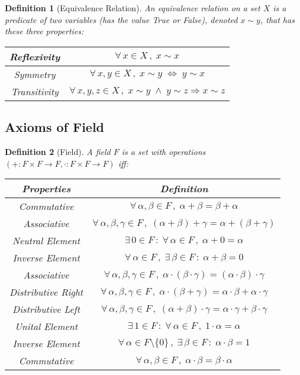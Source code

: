 \documentclass[12pt]{article}
\let\RA\Rightarrow
\let\LR\Leftrightarrow
\newcommand{\Forall}[1]{\forall\,{#1}\,,\;}
\newcommand{\Exist}[1]{\exists\,{#1}\,:\;}
\newtheorem{definition}{Definition}[subsection]
\begin{document}
\begin{definition}[Equivalence Relation]
  An equivalence relation on a set $X$ is a predicate of two variables (has the value True or False), denoted $x \sim y$, that has these three properties:
  \begin{table}[H]
    \centering
    \begin{tabular}{|c|c|}\hline
      Reflexivity & $\Forall{x \in X} x \sim x$\\\hline
      Symmetry & $\Forall{x,y \in X} x \sim y \;  \LR \; y \sim x$ \\\hline
      Transitivity & $\Forall{x,y,z \in X} x \sim y \; \land \; y \sim z \RA x \sim z$\\\hline
    \end{tabular}
  \end{table}
\end{definition}

\subsection{Axioms of Field}

\begin{definition}[Field]
  A field $F$ is a set with operations $(+:F\times F\to F,\cdot:F\times F\to F)$ iff:
  \begin{table}[H]
    \centering
    \begin{tabular}{|c|c|}\hline
      Properties & Definition \\\hline
      Commutative & $\Forall{\alpha,\beta\in F}\alpha+\beta=\beta+\alpha$ \\\hline
      Associative & $\Forall{\alpha,\beta,\gamma\in F} (\alpha+\beta)+\gamma=\alpha+(\beta+\gamma)$ \\\hline
      Neutral Element & $\Exist{0 \in F}\Forall{\alpha\in F} \alpha+0=\alpha$ \\\hline
      Inverse Element & $\Forall{\alpha\in F}\Exist{\beta \in F}\alpha+\beta=0$ \\\hline
      Associative & $\Forall{\alpha,\beta,\gamma \in F}\alpha\cdot(\beta\cdot \gamma)=(\alpha\cdot\beta)\cdot\gamma$ \\\hline
      Distributive Right & $\Forall{\alpha,\beta,\gamma\in F} \alpha\cdot(\beta+\gamma)=\alpha\cdot \beta+\alpha\cdot \gamma$ \\\hline
      Distributive Left & $\Forall{\alpha,\beta,\gamma\in F} (\alpha+\beta)\cdot \gamma=\alpha\cdot \gamma+\beta\cdot \gamma$ \\\hline
      Unital Element & $\Exist{1 \in F}\Forall{\alpha\in F} 1\cdot \alpha=\alpha$ \\\hline
      Inverse Element & $\Forall{\alpha\in F\setminus\{0\}}\Exist{\beta \in F} \alpha\cdot\beta=1$ \\\hline
      Commutative & $\Forall{\alpha,\beta\in F} \alpha\cdot\beta=\beta\cdot\alpha$ \\\hline
    \end{tabular}
  \end{table}
\end{definition}
\end{document}
